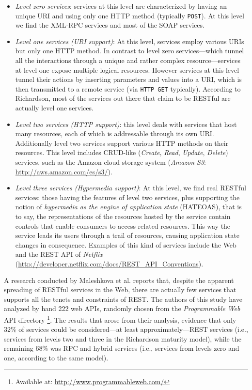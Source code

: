 \begin{itemize}
\item \emph{Level zero services}: services at this level are characterized by having an unique URI and using only one HTTP method (typically \texttt{POST}). At this level we find the XML-RPC services \cite{Laurent:2001} and most of the SOAP services. 
\item \emph{Level one services (URI support)}: At this level, services employ various URIs but only one HTTP method. In contrast to level zero services---which tunnel all the interactions through a unique and rather complex resource---services at level one expose multiple logical resources. However services at this level tunnel their actions by inserting parameters and values into a URI, which is then transmitted to a remote service (via \texttt{HTTP GET} typically). According to Richardson, most of the services out there that claim to be RESTful are actually level one services.
\item \emph{Level two services (HTTP support)}: this level deals with services that host many resources, each of which is addressable through its own URI. Additionally level two services support various HTTP methods on their resources. This level includes CRUD-like (\emph{Create}, \emph{Read}, \emph{Update}, \emph{Delete}) services, such as the Amazon cloud storage system (\emph{Amazon S3}: \href{http://aws.amazon.com/es/s3/} {http://aws.amazon.com/es/s3/}).
\item \emph{Level three services (Hypermedia support)}: At this level, we find real RESTful services: those having the features of level two services, plus supporting the notion of \emph{hypermedia as the engine of application state} (HATEOAS), that is to say, the representations of the resources hosted by the service contain controls that enable consumers to access related resources. This way the service leads its users through a trail of resources, causing application state changes in consequence. Examples of this kind of services include the Web and the REST API of \emph{Netflix} (\href{http://developer.netflix.com/docs/REST_API_Conventions} {http://developer.netflix.com/docs/REST\_{}API\_{}Conventions}). 
\end{itemize}

A research conducted by Maleshkova et al. \cite{Maleshkova:2010} reports that, despite the apparent spreading of RESTful services in the Web, there are actually few services that supports all the tenets and constraints of REST. The authors of this study have analyzed by hand 222 web APIs, randomly chosen from the \emph{Programmable Web }API directory\emph{} \footnote{Available at:\emph{ }\href{http://www.programmableweb.com/}{http://www.programmableweb.com/}}. The results that arose from their analysis, evidence that only 32\% of services could be considered---at least approximately---REST services (i.e., services from levels two and three in the Richardson maturity model), while the remaining 68\% was RPC and hybrid services (i.e., services from levels zero and one, according to the same model).

